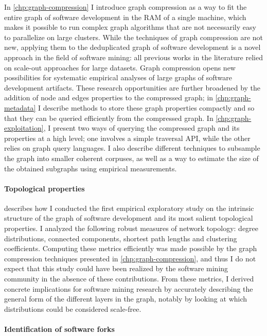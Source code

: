 In \cref{chp:graph-compression} I introduce graph compression as a way to
fit the entire graph of software development in the RAM of a single machine,
which makes it possible to run complex graph algorithms that are not
necessarily easy to parallelize on large clusters. While the techniques of
graph compression are not new, applying them to the deduplicated graph of
software development is a novel approach in the field of software mining: all
previous works in the literature relied on scale-out approaches for large
datasets.  Graph compression opens new possibilities for systematic empirical
analyses of large graphs of software development artifacts. These research
opportunities are further broadened by the addition of node and edges
properties to the compressed graph; in \cref{chp:graph-metadata} I describe
methods to store these graph properties compactly and so that they can be
queried efficiently from the compressed graph. In
\cref{chp:graph-exploitation}, I present two ways of querying the compressed
graph and its properties at a high level; one involves a simple traversal API,
while the other relies on graph query languages. I also describe different
techniques to subsample the graph into smaller coherent corpuses, as well as a
way to estimate the size of the obtained subgraphs using empirical
measurements.

\paragraph*{Topological properties}

 describes how I conducted the first empirical exploratory
study on the intrinsic structure of the graph of software development and its
most salient topological properties. I analyzed the following robust measures
of network topology: degree distributions, connected components, shortest path
lengths and clustering coefficients.
Computing these metrics efficiently was made possible by the graph compression
techniques presented in \cref{chp:graph-compression}, and thus I do not expect
that this study could have been realized by the software mining community in
the absence of these contributions. From these metrics, I derived concrete
implications for software mining research by accurately describing the general
form of the different layers in the graph, notably by looking at which
distributions could be considered scale-free.

\paragraph*{Identification of software forks}

